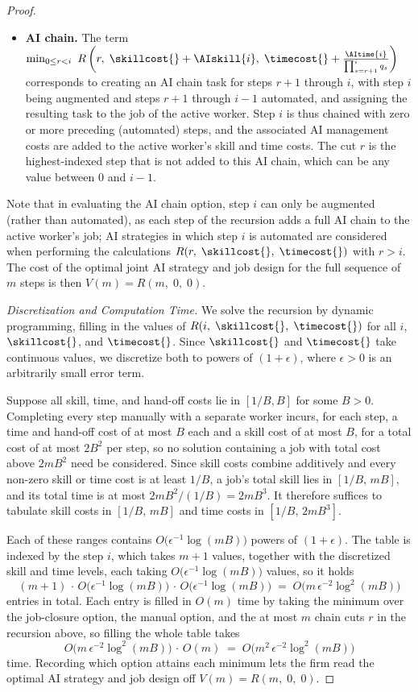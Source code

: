 \begin{proof}
\begin{itemize}
    \item \textbf{AI chain.}
    The term $\min_{0 \le r < i} \ R\left(r,\; \skillcost{} + \AIskill{i},\; \timecost{} + \frac{\AItime{i}}{\prod_{s=r+1}^{i} q_s}\right)$ corresponds to creating an AI chain task for steps $r+1$ through $i$, with step $i$ being augmented and steps $r+1$ through $i-1$ automated, and assigning the resulting task to the job of the active worker.
    Step $i$ is thus chained with zero or more preceding (automated) steps, and the associated AI management costs are added to the active worker's skill and time costs.
    The cut $r$ is the highest-indexed step that is not added to this AI chain, which can be any value between $0$ and $i-1$.
\end{itemize}
Note that in evaluating the AI chain option, step $i$ can only be augmented (rather than automated), as each step of the recursion adds a full AI chain to the active worker's job; AI strategies in which step $i$ is automated are considered when performing the calculations $R(r,\; \skillcost{},\; \timecost{})$ with $r > i$.
The cost of the optimal joint AI strategy and job design for the full sequence of $m$ steps is then $V(m) = R(m,\; 0,\; 0)$.

\emph{Discretization and Computation Time.}
We solve the recursion by dynamic programming, filling in the values of $R(i,\; \skillcost{},\; \timecost{})$ for all $i$, $\skillcost{}$, and $\timecost{}$.
Since $\skillcost{}$ and $\timecost{}$ take continuous values, we discretize both to powers of $(1+\epsilon)$, where $\epsilon > 0$ is an arbitrarily small error term.

Suppose all skill, time, and hand-off costs lie in $[1/B, B]$ for some $B > 0$.
Completing every step manually with a separate worker incurs, for each step, a time and hand-off cost of at most $B$ each and a skill cost of at most $B$, for a total cost of at most $2B^2$ per step, so no solution containing a job with total cost above $2mB^2$ need be considered.
Since skill costs combine additively and every non-zero skill or time cost is at least $1/B$, a job's total skill lies in $[1/B,\, mB]$, and its total time is at most $2mB^2/(1/B) = 2mB^3$.
It therefore suffices to tabulate skill costs in $[1/B,\, mB]$ and time costs in $[1/B,\, 2mB^3]$.

Each of these ranges contains $O\bigl(\epsilon^{-1}\log(mB)\bigr)$ powers of $(1+\epsilon)$.
The table is indexed by the step $i$, which takes $m+1$ values, together with the discretized skill and time levels, each taking $O\bigl(\epsilon^{-1}\log(mB)\bigr)$ values, so it holds
\[
(m+1)\,\cdot\,O\bigl(\epsilon^{-1}\log(mB)\bigr)\,\cdot\,O\bigl(\epsilon^{-1}\log(mB)\bigr) \;=\; O\bigl(m\,\epsilon^{-2}\log^2(mB)\bigr)
\]
entries in total.
Each entry is filled in $O(m)$ time by taking the minimum over the job-closure option, the manual option, and the at most $m$ chain cuts $r$ in the recursion above, so filling the whole table takes
\[
O\bigl(m\,\epsilon^{-2}\log^2(mB)\bigr)\,\cdot\,O(m) \;=\; O\bigl(m^2\,\epsilon^{-2}\log^2(mB)\bigr)
\]
time.
Recording which option attains each minimum lets the firm read the optimal AI strategy and job design off $V(m) = R(m,\; 0,\; 0)$.


\end{proof}
